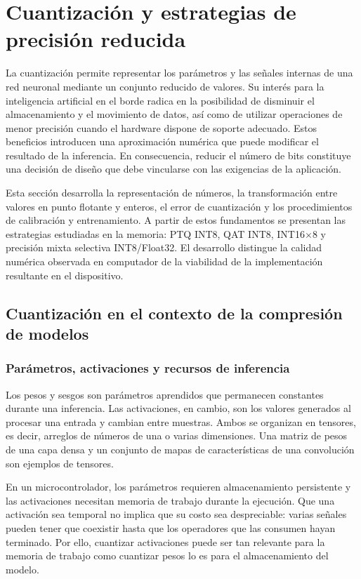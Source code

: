 \section{Cuantización y estrategias de precisión reducida}\label{cap:cuant}
La cuantización permite representar los parámetros y las señales internas de una red neuronal mediante un conjunto reducido de valores. Su interés para la inteligencia artificial en el borde radica en la posibilidad de disminuir el almacenamiento y el movimiento de datos, así como de utilizar operaciones de menor precisión cuando el hardware dispone de soporte adecuado. Estos beneficios introducen una aproximación numérica que puede modificar el resultado de la inferencia. En consecuencia, reducir el número de bits constituye una decisión de diseño que debe vincularse con las exigencias de la aplicación.

Esta sección desarrolla la representación de números, la transformación entre valores en punto flotante y enteros, el error de cuantización y los procedimientos de calibración y entrenamiento. A partir de estos fundamentos se presentan las estrategias estudiadas en la memoria: PTQ INT8, QAT INT8, INT16$\times$8 y precisión mixta selectiva INT8/Float32. El desarrollo distingue la calidad numérica observada en computador de la viabilidad de la implementación resultante en el dispositivo.

\subsection{Cuantización en el contexto de la compresión de modelos}
\subsubsection{Parámetros, activaciones y recursos de inferencia}
Los pesos y sesgos son parámetros aprendidos que permanecen constantes durante una inferencia. Las activaciones, en cambio, son los valores generados al procesar una entrada y cambian entre muestras. Ambos se organizan en tensores, es decir, arreglos de números de una o varias dimensiones. Una matriz de pesos de una capa densa y un conjunto de mapas de características de una convolución son ejemplos de tensores.

En un microcontrolador, los parámetros requieren almacenamiento persistente y las activaciones necesitan memoria de trabajo durante la ejecución. Que una activación sea temporal no implica que su costo sea despreciable: varias señales pueden tener que coexistir hasta que los operadores que las consumen hayan terminado. Por ello, cuantizar activaciones puede ser tan relevante para la memoria de trabajo como cuantizar pesos lo es para el almacenamiento del modelo.

